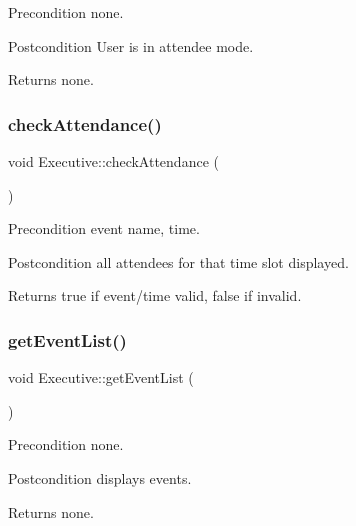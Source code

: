 \begin{DoxyPrecond}{Precondition}
none. 
\end{DoxyPrecond}
\begin{DoxyPostcond}{Postcondition}
User is in attendee mode. 
\end{DoxyPostcond}
\begin{DoxyReturn}{Returns}
none. 
\end{DoxyReturn}
\mbox{\label{class_executive_a9a557e6a6c0e9aa26f2af645a9a2b253}} 
\subsubsection{\texorpdfstring{check\+Attendance()}{checkAttendance()}}
{\footnotesize\ttfamily void Executive\+::check\+Attendance (\begin{DoxyParamCaption}{ }\end{DoxyParamCaption})\hspace{0.3cm}{\ttfamily [private]}}

\begin{DoxyPrecond}{Precondition}
event name, time. 
\end{DoxyPrecond}
\begin{DoxyPostcond}{Postcondition}
all attendees for that time slot displayed. 
\end{DoxyPostcond}
\begin{DoxyReturn}{Returns}
true if event/time valid, false if invalid. 
\end{DoxyReturn}
\mbox{\label{class_executive_ac98b519b4d5bc9f1354640fa5720a27d}} 
\subsubsection{\texorpdfstring{get\+Event\+List()}{getEventList()}}
{\footnotesize\ttfamily void Executive\+::get\+Event\+List (\begin{DoxyParamCaption}{ }\end{DoxyParamCaption})\hspace{0.3cm}{\ttfamily [private]}}

\begin{DoxyPrecond}{Precondition}
none. 
\end{DoxyPrecond}
\begin{DoxyPostcond}{Postcondition}
displays events. 
\end{DoxyPostcond}
\begin{DoxyReturn}{Returns}
none. 
\end{DoxyReturn}
\mbox{\label{class_executive_adef7cad3387e8fc79d92ffd418f45258}} 
